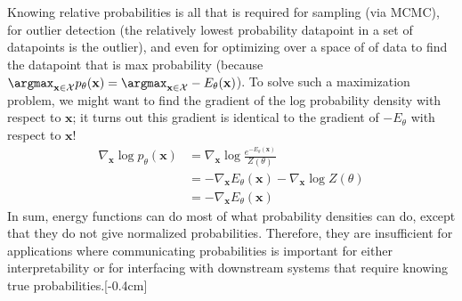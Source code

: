 


Knowing relative probabilities is all that is required for sampling (via MCMC), for outlier detection (the relatively lowest probability datapoint in a set of datapoints is the outlier), and even for optimizing over a space of of data to find the datapoint that is max probability (because $\argmax_{\mathbf{x} \in \mathcal{X}} p_{\theta}(\mathbf{x}) = \argmax_{\mathbf{x} \in \mathcal{X}} -E_{\theta}(\mathbf{x})$). To solve such a maximization problem, we might want to find the gradient of the log probability density with respect to $\mathbf{x}$; it turns out this gradient is identical to the gradient of $-E_{\theta}$ with respect to $\mathbf{x}$!
\begin{align}
    \nabla_{\mathbf{x}} \log p_{\theta}(\mathbf{x}) &= \nabla_{\mathbf{x}} \log \frac{e^{-E_{\theta}(\mathbf{x})}}{Z(\theta)}\\
    &= -\nabla_{\mathbf{x}} E_{\theta}(\mathbf{x}) - \nabla_{\mathbf{x}} \log Z(\theta)\\
    &= -\nabla_{\mathbf{x}} E_{\theta}(\mathbf{x})
\end{align}
In sum, energy functions can do most of what probability densities can do, except that they do not give normalized probabilities. Therefore, they are insufficient for applications where communicating probabilities is important for either interpretability or for interfacing with downstream systems that require knowing true probabilities.[-0.4cm]

